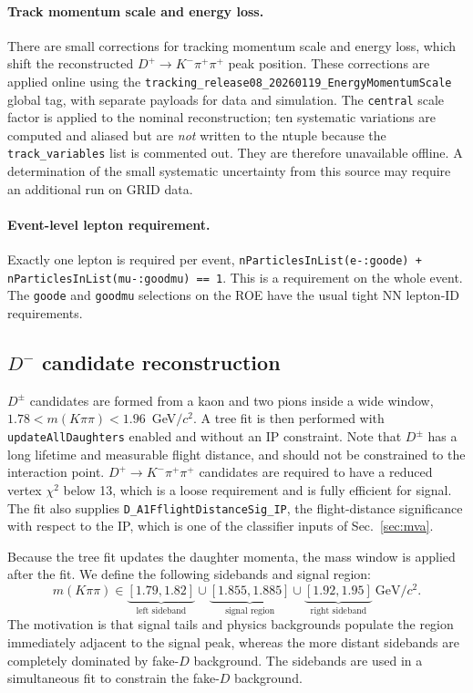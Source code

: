 \paragraph{Track momentum scale and energy loss.}
There are small corrections for tracking momentum scale and energy loss, which shift the reconstructed $D^+\to K^-\pi^+\pi^+$ peak position. 
These corrections are applied online
 using the
\texttt{tracking\_release08\_20260119\_EnergyMomentumScale} global tag, with
separate payloads for data and simulation.
The \texttt{central} scale factor is applied to the nominal reconstruction;
ten systematic variations are computed and aliased but are \emph{not}
written to the ntuple because the
\texttt{track\_variables} list is commented out.
They are therefore unavailable offline.
A determination of the small systematic uncertainty from this source may require an additional run on GRID data.



\paragraph{Event-level lepton requirement.}
Exactly one lepton is required per event,
\texttt{nParticlesInList(e-:goode) + nParticlesInList(mu-:goodmu) == 1}.
This is a requirement on the whole event.
The \texttt{goode}
and \texttt{goodmu} selections on the ROE have the usual tight NN lepton-ID requirements.

\subsection{$D^{-}$ candidate reconstruction}
\label{sec:recon:d}

$D^{\pm}$ candidates are formed from a kaon and two pions inside a wide
window, $1.78 < m(K\pi\pi) < 1.96$~GeV$/c^{2}$.
A tree fit is then performed with \texttt{updateAllDaughters} enabled and
without an IP constraint. Note that $D^{\pm}$ has a long lifetime and measurable flight distance,
and should not be constrained to the interaction point.
$D^+\to K^-\pi^+\pi^+$ candidates are required to have a reduced vertex $\chi^{2}$ below 13, which is a loose requirement and is fully efficient for signal.
The fit also supplies \texttt{D\_A1FflightDistanceSig\_IP}, the flight-distance
significance with respect to the IP, which is one of the classifier inputs of
Sec.~\ref{sec:mva}.
 
Because the tree fit updates the daughter momenta, the mass window is applied
 after the fit. 
We define the following sidebands and signal region:
\begin{equation}
  m(K\pi\pi) \in
  \underbrace{[1.79, 1.82]}_{\text{left sideband}} \cup
  \underbrace{[1.855, 1.885]}_{\text{signal region}} \cup
  \underbrace{[1.92, 1.95]}_{\text{right sideband}}\ \mathrm{GeV}/c^{2}.
  \label{eq:dmass-windows}
\end{equation}
The motivation is that signal tails and physics backgrounds populate the
region immediately adjacent to the signal peak, whereas the more distant
sidebands are completely dominated by fake-$D$ background. The sidebands are used in a simultaneous fit to constrain the fake-$D$ background. 




